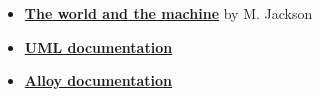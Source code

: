 \documentclass[../../main.tex]{subfiles}
\begin{document}
\begin{itemize}
    \item \textbf{\href{http://mcs.open.ac.uk/mj665/icse17kn.pdf}{The world and the machine}} by M. Jackson
    \item \textbf{\href{https://www.uml-diagrams.org/}{UML documentation}}
    \item \textbf{\href{https://alloytools.org/documentation.html}{Alloy documentation}}
\end{itemize}
\end{document}
